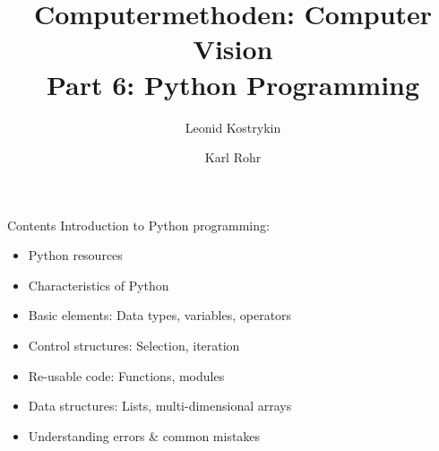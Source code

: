 \documentclass[aspectratio=169]{beamer}
\title{Computermethoden: Computer Vision\\Part 6: Python Programming}
\author{Leonid Kostrykin \and Karl Rohr}
\institute[BMCV Group, BioQuant, IPMB, Heidelberg University]{Biomedical Computer Vision Group (BMCV) \\ BioQuant, IPMB, Heidelberg University}
\date{}
\begin{document}
\begin{frame}
\titlepage%
\end{frame}


\begin{frame}{Contents}
\alert{Introduction to Python programming:}
\begin{itemize}
\item Python resources
\item Characteristics of Python
\item Basic elements: Data types, variables, operators
\item Control structures: Selection, iteration
\item Re-usable code: Functions, modules
\item Data structures: Lists, multi-dimensional arrays
\item Understanding errors \& common mistakes
\end{itemize}
\end{frame}
\end{document}
